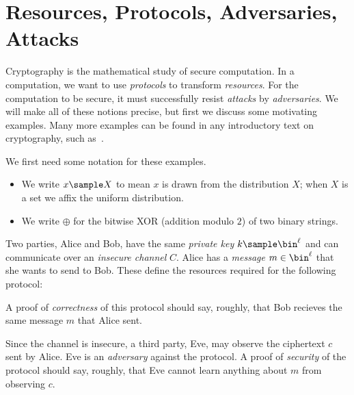 
\section{Resources, Protocols, Adversaries, Attacks}

Cryptography is the mathematical study of secure computation. In a computation,
we want to use \emph{protocols} to transform \emph{resources}. For the
computation to be secure, it must successfully resist \emph{attacks} by
\emph{adversaries}. We will make all of these notions precise, but first we
discuss some motivating examples. Many more examples can be found in any
introductory text on cryptography, such as~\cite{katz-lindell-2014, rosulek-2021,
	pass-shelat-2020}.

\begin{ntn}
	We first need some notation for these examples.
	\begin{itemize}
		\item We write $x\sample X$ to mean $x$ is drawn from the distribution
		      $X$; when $X$ is a set we affix the uniform distribution.
		\item We write $\oplus$ for the bitwise XOR (addition modulo $2$) of two
		      binary strings.
	\end{itemize}
\end{ntn}

\begin{ex}\label{ex:one-time pad}
	Two parties, Alice and Bob, have the same \emph{private key}
	$k\sample\bin^\ell$ and can communicate over an \emph{insecure channel} $C$.
	Alice has a \emph{message} $m\in\bin^\ell$ that she wants to send to Bob.
	These define the resources required for the following protocol:


	\noindent
	A proof of \emph{correctness} of this protocol should say, roughly, that Bob
	recieves the same message $m$ that Alice sent.

	Since the channel is insecure, a third party, Eve, may observe the ciphertext
	$c$ sent by Alice. Eve is an \emph{adversary} against the protocol. A proof of
	\emph{security} of the protocol should say, roughly, that Eve cannot learn
	anything about $m$ from observing $c$.
\end{ex}


